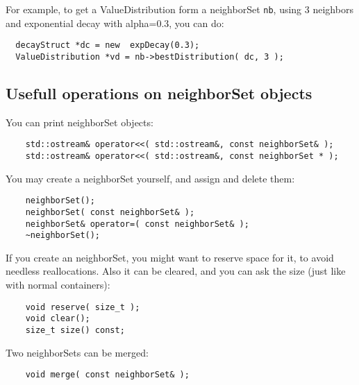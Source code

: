 \documentclass{report}
\begin{document}
For example, to get a ValueDistribution form a neighborSet {\tt nb}, using
3 neighbors and exponential decay with alpha=0.3, you can do:

\begin{footnotesize}
\begin{verbatim}
  decayStruct *dc = new  expDecay(0.3);
  ValueDistribution *vd = nb->bestDistribution( dc, 3 );
\end{verbatim}
\end{footnotesize}


\subsection{Usefull operations on neighborSet objects}

You can print neighborSet objects:

\begin{footnotesize}
\begin{verbatim}
    std::ostream& operator<<( std::ostream&, const neighborSet& );
    std::ostream& operator<<( std::ostream&, const neighborSet * );
\end{verbatim}
\end{footnotesize}

You may create a neighborSet yourself, and assign and delete them:

\begin{footnotesize}
\begin{verbatim}
    neighborSet();
    neighborSet( const neighborSet& );
    neighborSet& operator=( const neighborSet& );
    ~neighborSet();
\end{verbatim}
\end{footnotesize}

If you create an neighborSet, you might want to reserve space for it,
to avoid needless reallocations. Also it can be cleared, and you can
ask the size (just like with normal containers):

\begin{footnotesize}
\begin{verbatim}
    void reserve( size_t );
    void clear();
    size_t size() const;
\end{verbatim}
\end{footnotesize}

Two neighborSets can be merged:

\begin{footnotesize}
\begin{verbatim}
    void merge( const neighborSet& );
\end{verbatim}
\end{footnotesize}
\end{document}

